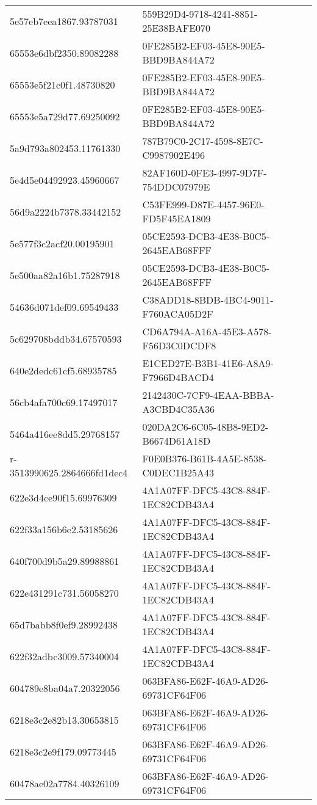 \begin{tabular}{ll}
5e57eb7eea1867.93787031 & 559B29D4-9718-4241-8851-25E38BAFE070 \\
65553e6dbf2350.89082288 & 0FE285B2-EF03-45E8-90E5-BBD9BA844A72 \\
65553e5f21c0f1.48730820 & 0FE285B2-EF03-45E8-90E5-BBD9BA844A72 \\
65553e5a729d77.69250092 & 0FE285B2-EF03-45E8-90E5-BBD9BA844A72 \\
5a9d793a802453.11761330 & 787B79C0-2C17-4598-8E7C-C9987902E496 \\
5e4d5e04492923.45960667 & 82AF160D-0FE3-4997-9D7F-754DDC07979E \\
56d9a2224b7378.33442152 & C53FE999-D87E-4457-96E0-FD5F45EA1809 \\
5e577f3c2acf20.00195901 & 05CE2593-DCB3-4E38-B0C5-2645EAB68FFF \\
5e500aa82a16b1.75287918 & 05CE2593-DCB3-4E38-B0C5-2645EAB68FFF \\
54636d071def09.69549433 & C38ADD18-8BDB-4BC4-9011-F760ACA05D2F \\
5c629708bddb34.67570593 & CD6A794A-A16A-45E3-A578-F56D3C0DCDF8 \\
640e2dedc61cf5.68935785 & E1CED27E-B3B1-41E6-A8A9-F7966D4BACD4 \\
56cb4afa700c69.17497017 & 2142430C-7CF9-4EAA-BBBA-A3CBD4C35A36 \\
5464a416ee8dd5.29768157 & 020DA2C6-6C05-48B8-9ED2-B6674D61A18D \\
r-3513990625.2864666fd1dec4 & F0E0B376-B61B-4A5E-8538-C0DEC1B25A43 \\
622e3d4ce90f15.69976309 & 4A1A07FF-DFC5-43C8-884F-1EC82CDB43A4 \\
622f33a156b6e2.53185626 & 4A1A07FF-DFC5-43C8-884F-1EC82CDB43A4 \\
640f700d9b5a29.89988861 & 4A1A07FF-DFC5-43C8-884F-1EC82CDB43A4 \\
622e431291c731.56058270 & 4A1A07FF-DFC5-43C8-884F-1EC82CDB43A4 \\
65d7babb8f0ef9.28992438 & 4A1A07FF-DFC5-43C8-884F-1EC82CDB43A4 \\
622f32adbc3009.57340004 & 4A1A07FF-DFC5-43C8-884F-1EC82CDB43A4 \\
604789e8ba04a7.20322056 & 063BFA86-E62F-46A9-AD26-69731CF64F06 \\
6218e3c2e82b13.30653815 & 063BFA86-E62F-46A9-AD26-69731CF64F06 \\
6218e3c2e9f179.09773445 & 063BFA86-E62F-46A9-AD26-69731CF64F06 \\
60478ae02a7784.40326109 & 063BFA86-E62F-46A9-AD26-69731CF64F06 \\

\end{tabular}
